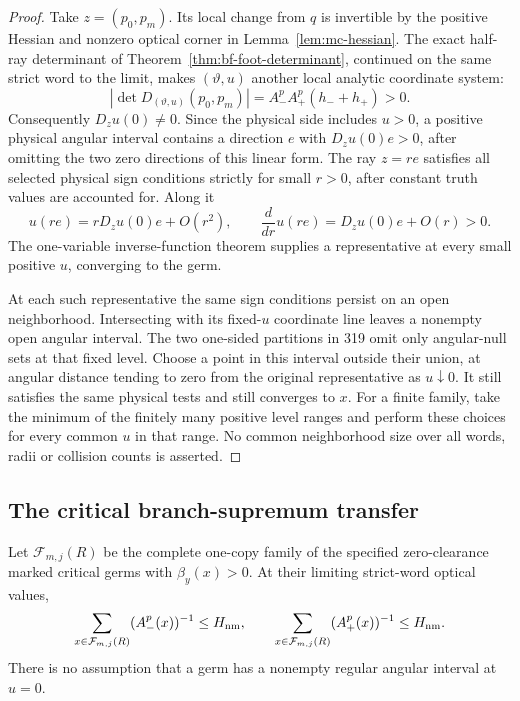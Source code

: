 \begin{proof}
Take $z=(p_0,p_m)$. Its local change from $q$ is invertible by the
positive Hessian and nonzero optical corner in
Lemma~\ref{lem:mc-hessian}. The exact half-ray determinant of
Theorem~\ref{thm:bf-foot-determinant}, continued on the same strict
word to the limit, makes $(\vartheta,u)$ another local analytic
coordinate system:
\[
 \left|\det D_{(\vartheta,u)}(p_0,p_m)\right|
             =A_-^pA_+^p(h_-+h_+)>0 .
\]
Consequently $D_zu(0)\ne0$. Since the physical side includes $u>0$,
a positive physical angular interval contains a direction $e$ with
$D_zu(0)e>0$, after omitting the two zero directions of this linear
form. The ray $z=re$ satisfies all selected physical sign conditions
strictly for small $r>0$, after constant truth values are accounted
for. Along it
\[
 u(re)=rD_zu(0)e+O(r^2),\qquad
 \frac{d}{dr}u(re)=D_zu(0)e+O(r)>0 .
\]
The one-variable inverse-function theorem supplies a representative
at every small positive $u$, converging to the germ.

At each such representative the same sign conditions persist on
an open neighborhood. Intersecting with its fixed-$u$ coordinate
line leaves a nonempty open angular interval. The two one-sided
partitions in 319 omit only angular-null sets at that fixed level.
Choose a point in this interval outside their union, at angular
distance tending to zero from the original representative as
$u\downarrow0$. It still satisfies the same physical tests and
still converges to $x$. For a finite family, take the minimum of
the finitely many positive level ranges and perform these choices
for every common $u$ in that range. No common neighborhood size
over all words, radii or collision counts is asserted.
\end{proof}

\subsection{The critical branch-supremum transfer}

\begin{lemma}
\label{pc:half-sums}
Let $\mathcal F_{m,j}(R)$ be the complete one-copy family of the
specified zero-clearance marked critical germs with
$\beta_y(x)>0$. At their limiting strict-word optical values,
\begin{equation}\label{pc:half-sums-bound}
 \sum_{x\in\mathcal F_{m,j}(R)}(A_-^p(x))^{-1}\le H_{\rm nm},
 \qquad
 \sum_{x\in\mathcal F_{m,j}(R)}(A_+^p(x))^{-1}\le H_{\rm nm}.
\end{equation}
There is no assumption that a germ has a nonempty regular angular
interval at $u=0$.
\end{lemma}

